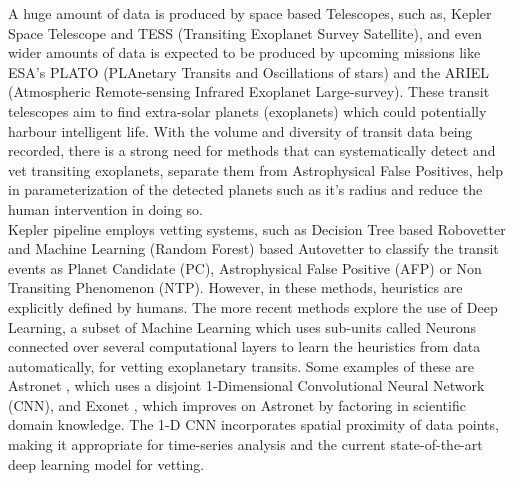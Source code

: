 




A huge amount of data is produced by space based Telescopes, such as, Kepler Space Telescope and TESS (Transiting Exoplanet Survey Satellite), and even wider amounts of data is expected to be produced by upcoming missions like ESA's PLATO (PLAnetary Transits and Oscillations of stars) and the ARIEL (Atmospheric Remote-sensing Infrared Exoplanet Large-survey). These transit telescopes aim to find extra-solar planets (exoplanets) which could potentially harbour intelligent life. With the volume and diversity of transit data being recorded, there is a strong need for methods that can systematically detect and vet transiting exoplanets, separate them from Astrophysical False Positives, help in parameterization of the detected planets such as it's radius and reduce the human intervention in doing so.\\

Kepler pipeline employs vetting systems, such as Decision Tree based Robovetter \cite{robovetter} and Machine Learning (Random Forest) based Autovetter \cite{autovetter} to classify the transit events as Planet Candidate (PC), Astrophysical False Positive (AFP) or Non Transiting Phenomenon (NTP). However, in these methods, heuristics are explicitly defined by humans. The more recent methods explore the use of Deep Learning, a subset of Machine Learning which uses sub-units called Neurons connected over several computational layers to learn the heuristics from data automatically, for vetting exoplanetary transits. Some examples of these are Astronet \cite{astronet}, which uses a disjoint 1-Dimensional Convolutional Neural Network (CNN), and Exonet \cite{exonet}, which improves on Astronet by factoring in scientific domain knowledge. The 1-D CNN incorporates spatial proximity of data points, making it appropriate for time-series analysis and the current state-of-the-art deep learning model for vetting.\\

